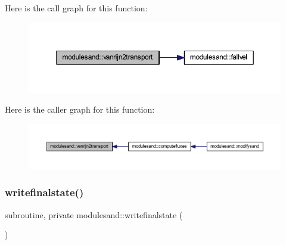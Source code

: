Here is the call graph for this function\+:\nopagebreak
\begin{figure}[H]
\begin{center}
\leavevmode
\includegraphics[width=350pt]{namespacemodulesand_afb5faaa6c12c4db3fe47e079018ed0f7_cgraph}
\end{center}
\end{figure}
Here is the caller graph for this function\+:\nopagebreak
\begin{figure}[H]
\begin{center}
\leavevmode
\includegraphics[width=350pt]{namespacemodulesand_afb5faaa6c12c4db3fe47e079018ed0f7_icgraph}
\end{center}
\end{figure}
\mbox{\label{namespacemodulesand_afb972f404f3d402212f2af24b34ddb90}} 
\subsubsection{\texorpdfstring{writefinalstate()}{writefinalstate()}}
{\footnotesize\ttfamily subroutine, private modulesand\+::writefinalstate (\begin{DoxyParamCaption}{ }\end{DoxyParamCaption})\hspace{0.3cm}{\ttfamily [private]}}

